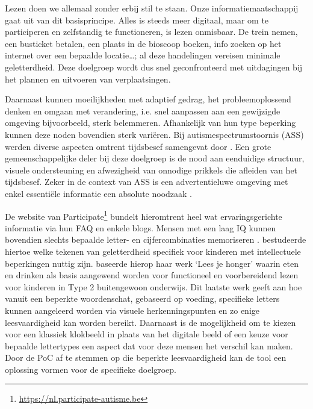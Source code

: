 Lezen doen we allemaal zonder erbij stil te staan. Onze informatiemaatschappij gaat uit van dit basisprincipe. Alles is steeds meer digitaal, maar om te participeren en zelfstandig te functioneren, is lezen onmisbaar. De trein nemen, een busticket betalen, een plaats in de bioscoop boeken, info zoeken op het internet over een bepaalde locatie\ldots; al deze handelingen vereisen minimale geletterdheid. Deze doelgroep wordt dus snel geconfronteerd met uitdagingen bij het plannen en uitvoeren van verplaatsingen. 

Daarnaast kunnen moeilijkheden met adaptief gedrag, het probleemoplossend denken en omgaan met verandering, i.e. snel aanpassen aan een gewijzigde omgeving bijvoorbeeld, sterk belemmeren. Afhankelijk van hun type beperking kunnen deze noden bovendien sterk variëren. Bij autismespectrumstoornis (ASS) werden diverse aspecten omtrent tijdsbesef samengevat door \textcite{Degrieck2014}. Een grote gemeenschappelijke deler bij deze doelgroep is de nood aan eenduidige structuur, visuele ondersteuning en afwezigheid van onnodige prikkels die afleiden van het tijdsbesef. Zeker in de context van ASS is een advertentieluwe omgeving met enkel essentiële informatie een absolute noodzaak \autocite{Roeyers2014}. 

De website van Participate\footnote{\url{https://nl.participate-autisme.be}} bundelt hieromtrent heel wat ervaringsgerichte informatie via hun FAQ en enkele blogs. Mensen met een laag IQ kunnen bovendien slechts bepaalde letter- en cijfercombinaties memoriseren \autocite{DeGraaf2001, Tytgat2014}. \textcite{Tilborg2018} bestudeerde hiertoe welke tekenen van geletterdheid specifiek voor kinderen met intellectuele beperkingen nuttig zijn. \textcite{Uyttersprot2021} baseerde hierop haar werk `Lees je honger' waarin eten en drinken als basis aangewend worden voor functioneel en voorbereidend lezen voor kinderen in Type 2 buitengewoon onderwijs. Dit laatste werk geeft aan hoe vanuit een beperkte woordenschat, gebaseerd op voeding, specifieke letters kunnen aangeleerd worden via visuele herkenningspunten en zo enige leesvaardigheid kan worden bereikt. Daarnaast is de mogelijkheid om te kiezen voor een klassiek klokbeeld in plaats van het digitale beeld of een keuze voor bepaalde lettertypes een aspect dat voor deze mensen het verschil kan maken. Door de PoC af te stemmen op die beperkte leesvaardigheid kan de tool een oplossing vormen voor de specifieke doelgroep. 

